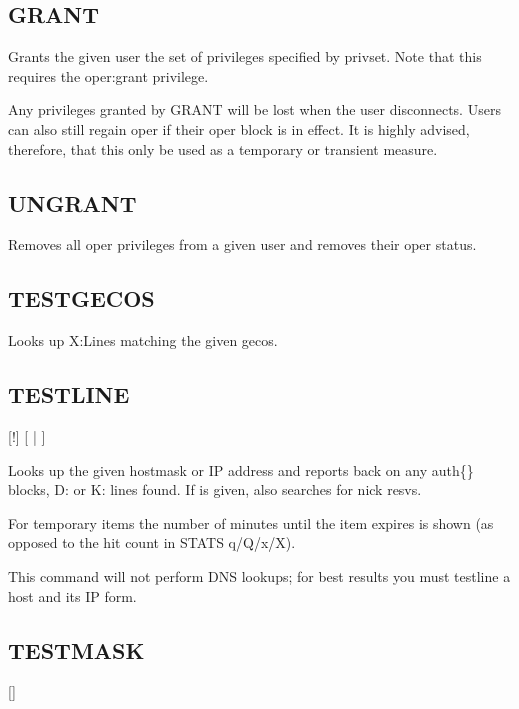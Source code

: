 \subsection{GRANT}

  
	Grants the given user the set of privileges specified by privset. Note that
	this requires the oper:grant privilege.

	Any privileges granted by GRANT will be lost when the user disconnects. Users
	can also still regain oper if their oper block is in effect. It is highly
	advised, therefore, that this only be used as a temporary or transient measure.


\subsection{UNGRANT}

 
	Removes all oper privileges from a given user and removes their oper status.

\subsection{TESTGECOS}

 
	Looks up X:Lines matching the given gecos.

\subsection{TESTLINE}

	[!]
	[ | ]

	Looks up the given hostmask or IP address and reports back on any
	auth\{\} blocks, D: or K: lines found. If  is
	given, also searches for nick resvs.

	For temporary items the number of minutes until the item expires
	is shown (as opposed to the hit count in STATS q/Q/x/X).

	This command will not perform DNS lookups; for best
	results you must testline a host and its IP form.

\subsection{TESTMASK}

	 []

